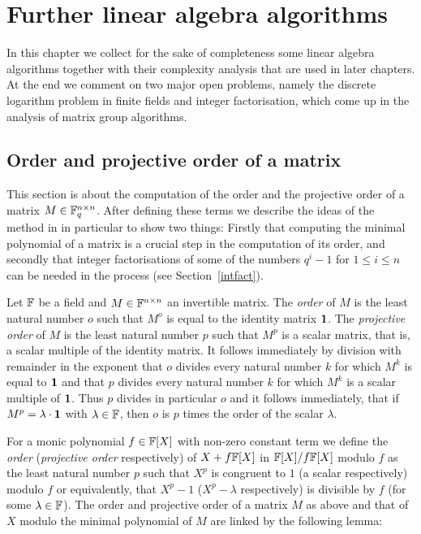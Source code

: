 
\chapter{Further linear algebra algorithms}
\label{chap:linalg}

In this chapter we collect for the sake of completeness some
linear algebra algorithms together with their complexity analysis
that are used in later chapters. At the end we comment on two major
open problems, namely the discrete logarithm problem in finite fields and
integer factorisation, which come up in the analysis of matrix group
algorithms.

\section{Order and projective order of a matrix}
\label{sec:orders}

This section is about the computation of the order and the projective
order of a matrix $M \in \mathbb{F}_q^{n \times n}$. After defining these 
terms we describe the 
ideas of the method in \cite{CellLeedOrder} in particular to show
two things: Firstly that computing the minimal polynomial of a matrix
is a crucial step in the computation of its order, and secondly that
integer factorisations of some of the numbers $q^i-1$ for $1 \le i \le n$ 
can be needed in the process (see Section~\ref{intfact}).

\begin{DefProp}
Let $\mathbb{F}$ be a field and $M \in \mathbb{F}^{n \times
n}$ an invertible matrix. The \emph{order} of $M$ is the least natural
number $o$ such that $M^o$ is equal to the identity matrix\/ $\mathbf{1}$.
The \emph{projective order} of $M$ is the least natural number $p$
such that $M^p$ is a scalar matrix, that is, a scalar multiple of the
identity matrix. It follows immediately by division with remainder in
the exponent that $o$ divides every natural number $k$ for which 
$M^k$ is equal to\/ $\mathbf{1}$ and that $p$ divides every natural number $k$
for which $M^k$ is a scalar multiple of\/ $\mathbf{1}$. Thus $p$ divides in
particular $o$ and it follows immediately, that if $M^p = \lambda \cdot
\mathbf{1}$ with $\lambda \in \mathbb{F}$, then $o$ is $p$ times the order of the
scalar $\lambda$. \proofend
\end{DefProp}

For a monic polynomial $f \in \mathbb{F}[X]$ with non-zero constant term
we define the \emph{order} (\emph{projective order} respectively) of 
$X + f\mathbb{F}[X]$ in $\mathbb{F}[X]/f\mathbb{F}[X]$ modulo $f$ as the least natural 
number $p$ such that $X^p$ is congruent 
to $1$ (a scalar respectively) modulo $f$ or equivalently, that $X^p-1$ 
($X^p-\lambda$ respectively) is
divisible by $f$ (for some $\lambda \in \mathbb{F}$). 
The order and projective order
of a matrix $M$ as above and that of $X$ modulo the minimal polynomial 
of $M$ are linked by the following lemma:

